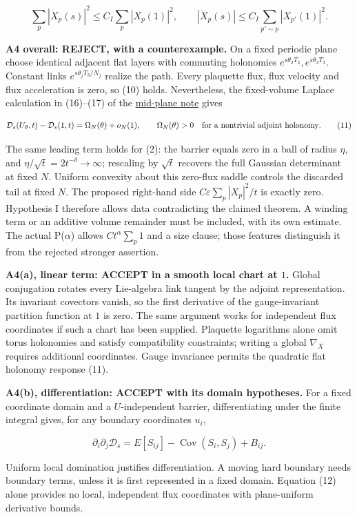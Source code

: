 \documentclass[11pt,a4paper]{article}
\begin{document}
\[\sum_p|\dot X_p(s)|^2\le C_I\sum_p|X_p(1)|^2,\qquad
|\ddot X_p(s)|\le C_I\sum_{p'\sim p}|X_{p'}(1)|^2.\tag{10}\]

\textbf{A4 overall: REJECT, with a counterexample.} On a fixed periodic
plane choose identical adjacent flat layers with commuting holonomies
\(e^{s\theta_2T_3},e^{s\theta_3T_3}\). Constant links
\(e^{s\theta_jT_3/N_j}\) realize the path. Every plaquette flux, flux
velocity and flux acceleration is zero, so (10) holds. Nevertheless, the
fixed-volume Laplace calculation in (16)--(17) of the
\href{su2-midplane-order-t.md}{mid-plane note} gives

\[\mathcal D_s(U_\theta,t)-\mathcal D_s(1,t)
=\Omega_N(\theta)+o_N(1),\qquad
\Omega_N(\theta)>0\quad\hbox{for a nontrivial adjoint holonomy}.\tag{11}\]

The same leading term holds for (2): the barrier equals zero in a ball
of radius \(\eta\), and \(\eta/\sqrt t=2t^{-\delta}\to\infty\);
rescaling by \(\sqrt t\) recovers the full Gaussian determinant at fixed
\(N\). Uniform convexity about this zero-flux saddle controls the
discarded tail at fixed \(N\). The proposed right-hand side
\(C\varepsilon\sum_p|X_p|^2/t\) is exactly zero. Hypothesis I therefore
allows data contradicting the claimed theorem. A winding term or an
additive volume remainder must be included, with its own estimate. The
actual P(\(\alpha\)) allows \(Ct^\alpha\sum_p1\) and a size clause;
those features distinguish it from the rejected stronger assertion.

\textbf{A4(a), linear term: ACCEPT in a smooth local chart at \(1\).}
Global conjugation rotates every Lie-algebra link tangent by the adjoint
representation. Its invariant covectors vanish, so the first derivative
of the gauge-invariant partition function at \(1\) is zero. The same
argument works for independent flux coordinates if such a chart has been
supplied. Plaquette logarithms alone omit torus holonomies and satisfy
compatibility constraints; writing a global \(\nabla_X\) requires
additional coordinates. Gauge invariance permits the quadratic flat
holonomy response (11).

\textbf{A4(b), differentiation: ACCEPT with its domain hypotheses.} For
a fixed coordinate domain and a \(U\)-independent barrier,
differentiating under the finite integral gives, for any boundary
coordinates \(u_i\),

\[\partial_i\partial_j\mathcal D_s
=E[S_{ij}]-\operatorname{Cov}(S_i,S_j)+B_{ij}.\tag{12}\]

Uniform local domination justifies differentiation. A moving hard
boundary needs boundary terms, unless it is first represented in a fixed
domain. Equation (12) alone provides no local, independent flux
coordinates with plane-uniform derivative bounds.
\end{document}
